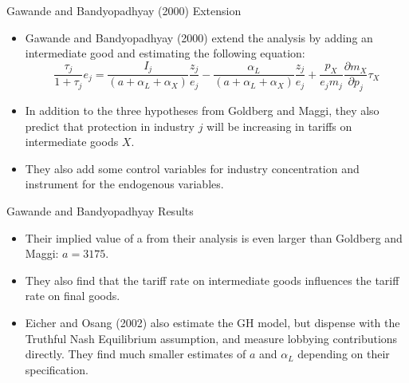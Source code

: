 \documentclass[aspectratio=169]{beamer}
\begin{document}

\begin{frame}{Gawande and Bandyopadhyay (2000) Extension}

\begin{itemize}
    \item<1-> Gawande and Bandyopadhyay (2000) extend the analysis by adding an intermediate good and estimating the following equation:
    \begin{equation*}
        \frac{\tau_{j}}{1 + \tau_{j}} e_{j} = \frac{I_{j}}{\left( a + \alpha_{L} + \alpha_{X} \right)} \frac{z_{j}}{e_{j}} - \frac{\alpha_{L}}{\left( a + \alpha_{L} + \alpha_{X} \right)} \frac{z_{j}}{e_{j}} + \frac{p_{X}}{e_{j} m_{j}} \frac{\partial m_{X}}{\partial p_{j}} \tau_{X}
    \end{equation*}
    \item<2-> In addition to the three hypotheses from Goldberg and Maggi, they also predict that protection in industry $ j $ will be increasing in tariffs on intermediate goods $ X $.
    \item<3-> They also add some control variables for industry concentration and instrument for the endogenous variables.
\end{itemize}
    
\end{frame}


\begin{frame}{Gawande and Bandyopadhyay Results}

\begin{itemize}
    \item<1->  Their implied value of a from their analysis is even larger than Goldberg and Maggi: $ a = 3175 $.
    \item<2-> They also find that the tariff rate on intermediate goods influences the tariff rate on final goods.
    \item<3-> Eicher and Osang (2002) also estimate the GH model, but dispense with the Truthful Nash Equilibrium assumption, and measure lobbying contributions directly.  They find much smaller estimates of $ a $ and $ \alpha_{L} $ depending on their specification.
\end{itemize}
    
\end{frame}

\end{document}
